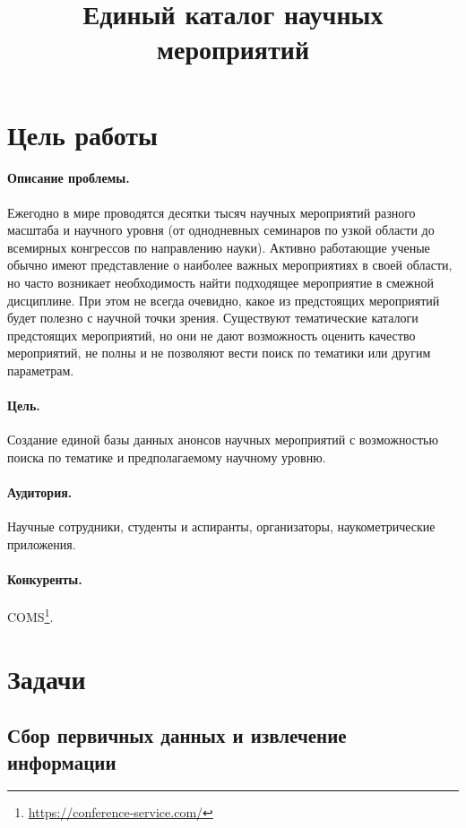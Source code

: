 \documentclass[12pt,oneside]{article}
\title{Единый каталог научных мероприятий}
\author{}
\begin{document}
\maketitle

\section{Цель работы}

\paragraph{Описание проблемы.} Ежегодно в мире проводятся десятки тысяч научных мероприятий разного масштаба и научного уровня (от однодневных семинаров по узкой области до всемирных конгрессов по направлению науки). Активно работающие ученые обычно имеют представление о наиболее важных мероприятиях в своей области, но часто возникает необходимость найти подходящее мероприятие в смежной дисциплине. При этом не всегда очевидно, какое из предстоящих мероприятий будет полезно с научной точки зрения. Существуют тематические каталоги предстоящих мероприятий, но они не дают возможность оценить качество мероприятий, не полны и не позволяют вести поиск по тематики или другим параметрам.

\paragraph{Цель.} Создание единой базы данных анонсов научных мероприятий с возможностью поиска по тематике и предполагаемому научному уровню.

\paragraph{Аудитория.} Научные сотрудники, студенты и аспиранты, организаторы, наукометрические приложения.

\paragraph{Конкуренты.} COMS\footnote{\url{https://conference-service.com/}}.

\section{Задачи}

\subsection{Сбор первичных данных и извлечение информации}
\end{document}
